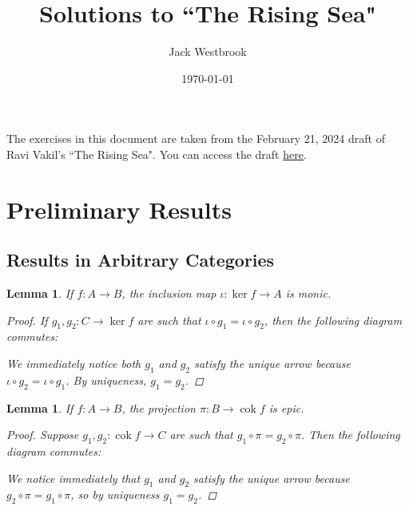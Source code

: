 \documentclass{article}
\title{Solutions to ``The Rising Sea"}
\author{Jack Westbrook}
\date\today
\DeclareMathOperator{\cok}{cok}
\newtheorem{lemma}[theorem]{Lemma}
\begin{document}
\maketitle %

The exercises in this document are taken from the February 21, 2024 draft of Ravi Vakil's ``The Rising Sea".
You can access the draft \href{https://math.stanford.edu/~vakil/216blog/FOAGfeb2124public.pdf}{here}.

\section*{Preliminary Results}
\subsection*{Results in Arbitrary Categories}
\begin{lemma}\label{lem:ker monic}
    If $f:A\to B$, the inclusion map $\iota:\ker f\to A$ is monic.
    \begin{proof}
        If $g_1,g_2:C\to \ker f$ are such that $\iota\circ g_1=\iota\circ g_2$, then the following diagram commutes:
        \begin{center}
        \end{center}
        We immediately notice both $g_1$ and $g_2$ satisfy the unique arrow because $\iota\circ g_2=\iota\circ g_1$. By uniqueness, $g_1=g_2$.
    \end{proof}
\end{lemma}
\begin{lemma}\label{lem:cok epic}
    If $f:A\to B$, the projection $\pi:B \to \cok f$ is epic.
    \begin{proof}
        Suppose $g_1,g_2:\cok f\to C$ are such that $g_1\circ \pi=g_2\circ \pi$. Then the following diagram commutes:
        \begin{center}
        \end{center}
        We notice immediately that $g_1$ and $g_2$ satisfy the unique arrow because $g_2\circ \pi=g_1\circ \pi$, so by uniqueness $g_1=g_2$.
    \end{proof}
\end{lemma}
\end{document}
